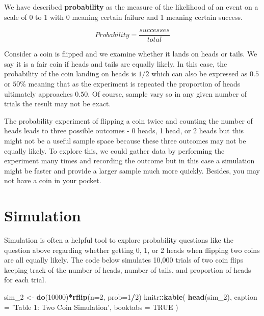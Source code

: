 \documentclass[]{book}
\newenvironment{Shaded}{\begin{snugshade}}{\end{snugshade}}
\newcommand{\KeywordTok}[1]{\textcolor[rgb]{0.13,0.29,0.53}{\textbf{#1}}}
\newcommand{\DataTypeTok}[1]{\textcolor[rgb]{0.13,0.29,0.53}{#1}}
\newcommand{\DecValTok}[1]{\textcolor[rgb]{0.00,0.00,0.81}{#1}}
\newcommand{\StringTok}[1]{\textcolor[rgb]{0.31,0.60,0.02}{#1}}
\newcommand{\OtherTok}[1]{\textcolor[rgb]{0.56,0.35,0.01}{#1}}
\newcommand{\OperatorTok}[1]{\textcolor[rgb]{0.81,0.36,0.00}{\textbf{#1}}}
\newcommand{\NormalTok}[1]{#1}
\theoremstyle{definition}
\theoremstyle{definition}
\theoremstyle{definition}
\theoremstyle{remark}
\begin{document}
We have described \textbf{probability} as the measure of the likelihood
of an event on a scale of 0 to 1 with 0 meaning certain failure and 1
meaning certain success.

\[Probability = \frac{successes}{total}\]

Consider a coin is flipped and we examine whether it lands on heads or
tails. We say it is a fair coin if heads and tails are equally likely.
In this case, the probability of the coin landing on heads is \(1/2\)
which can also be expressed as \(0.5\) or \(50\%\) meaning that as the
experiment is repeated the proportion of heads ultimately approaches
\(0.50\). Of course, sample vary so in any given number of trials the
result may not be exact.

The probability experiment of flipping a coin twice and counting the
number of heads leads to three possible outcomes - 0 heads, 1 head, or 2
heads but this might not be a useful sample space because these three
outcomes may not be equally likely. To explore this, we could gather
data by performing the experiment many times and recording the outcome
but in this case a simulation might be faster and provide a larger
sample much more quickly. Besides, you may not have a coin in your
pocket.

\section{Simulation}\label{simulation}

Simulation is often a helpful tool to explore probability questions like
the question above regarding whether getting 0, 1, or 2 heads when
flipping two coins are all equally likely. The code below simulates
10,000 trials of two coin flips keeping track of the number of heads,
number of tails, and proportion of heads for each trial.

\begin{Shaded}
\begin{Highlighting}[]
\NormalTok{sim_}\DecValTok{2}\NormalTok{ <-}\StringTok{ }\KeywordTok{do}\NormalTok{(}\DecValTok{10000}\NormalTok{)}\OperatorTok{*}\KeywordTok{rflip}\NormalTok{(}\DataTypeTok{n=}\DecValTok{2}\NormalTok{, }\DataTypeTok{prob=}\DecValTok{1}\OperatorTok{/}\DecValTok{2}\NormalTok{)}
\NormalTok{knitr}\OperatorTok{::}\KeywordTok{kable}\NormalTok{(}
  \KeywordTok{head}\NormalTok{(sim_}\DecValTok{2}\NormalTok{), }\DataTypeTok{caption =} \StringTok{'Table 1: Two Coin Simulation'}\NormalTok{,}
  \DataTypeTok{booktabs =} \OtherTok{TRUE}
\NormalTok{)}
\end{Highlighting}
\end{Shaded}
\end{document}
